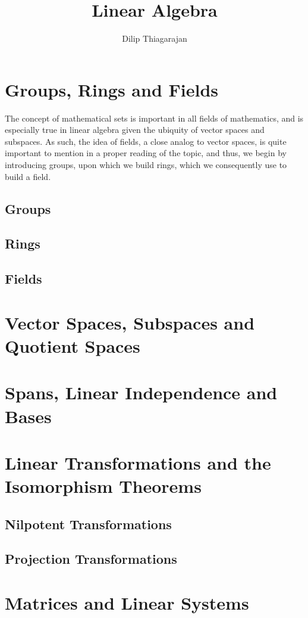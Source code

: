 \documentclass[11pt]{report}
\begin{document}
\title{Linear Algebra}
\author{Dilip Thiagarajan}
\maketitle
\tableofcontents{}

\chapter{Groups, Rings and Fields}
The concept of mathematical sets is important in all fields of mathematics, and is especially true in linear algebra given the ubiquity of vector spaces and subspaces. As such, the idea of fields, a close analog to vector spaces, is quite important to mention in a proper reading of the topic, and thus, we begin by introducing groups, upon which we build rings, which we consequently use to build a field. 
\section{Groups}
\section{Rings}
\section{Fields}


\chapter{Vector Spaces, Subspaces and Quotient Spaces}


\chapter{Spans, Linear Independence and Bases}


\chapter{Linear Transformations and the Isomorphism Theorems}
\section{Nilpotent Transformations}
\section{Projection Transformations}
\chapter{Matrices and Linear Systems}
\end{document}
